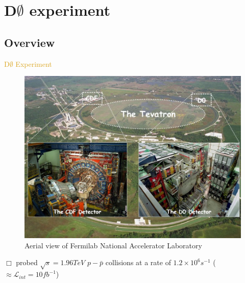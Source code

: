 
\section{D$\emptyset$ experiment}

\subsection{Overview}
\begin{frame}{\textcolor{Goldenrod}{D$\emptyset$ Experiment}}
  \begin{overlayarea}{\textwidth}{\textheight}
    \begin{figure}[h]\centering
      \includegraphics[height=0.5\textheight]{./Images/02_D0_general.jpg}
      \caption*{Aerial view of Fermilab National Accelerator Laboratory}
    \end{figure}
    \itt
  \item[$\Box$] probed $\sqrt{s} = 1.96 TeV$ $p-\bar{p}$ collisions at
    a rate of \alert{$1.2\times 10^{6} s^{-1}$} (\alert{$\approx
      \mathcal{L}_{int} = 10 fb^{-1}$})
    \tti
  \end{overlayarea}
\end{frame}

